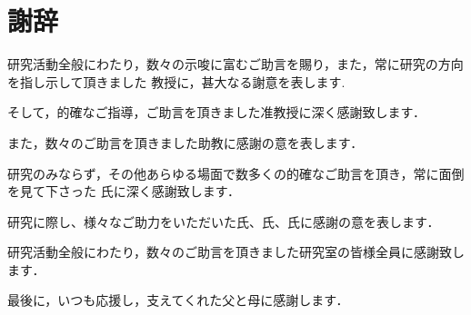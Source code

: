 
\chapter*{謝辞}
研究活動全般にわたり，数々の示唆に富むご助言を賜り，また，常に研究の方向を指し示して頂きました
教授に，甚大なる謝意を表します.

そして，的確なご指導，ご助言を頂きました准教授に深く感謝致します．

また，数々のご助言を頂きました助教に感謝の意を表します．

研究のみならず，その他あらゆる場面で数多くの的確なご助言を頂き，常に面倒を見て下さった
氏に深く感謝致します．

研究に際し、様々なご助力をいただいた氏、氏、氏に感謝の意を表します．

研究活動全般にわたり，数々のご助言を頂きました研究室の皆様全員に感謝致します．

最後に，いつも応援し，支えてくれた父と母に感謝します．
